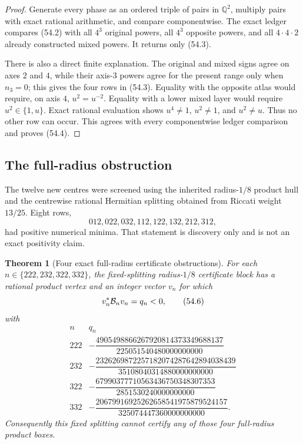 \documentclass[11pt,oneside]{article}
\newtheorem{theorem}{Theorem}[section]
\theoremstyle{definition}
\theoremstyle{remark}
\begin{document}
\begin{proof}
Generate every phase as an ordered triple of pairs in
\(\mathbb Q^2\), multiply pairs with exact rational arithmetic, and
compare componentwise.  The exact ledger compares (54.2) with all
\(4^3\) original powers, all \(4^3\) opposite powers, and all
\(4\cdot4\cdot2\) already constructed mixed powers.  It returns
only (54.3).

There is also a direct finite explanation.  The original and mixed
signs agree on axes \(2\) and \(4\), while their axis-\(3\) powers
agree for the present range only when \(n_3=0\); this gives the
four rows in (54.3).  Equality with the opposite atlas would
require, on axis \(4\), \(u^2=u^{-2}\).  Equality with a lower mixed
layer would require \(u^2\in\{1,u\}\).  Exact rational evaluation
shows \(u^4\ne1\), \(u^2\ne1\), and \(u^2\ne u\).  Thus no other
row can occur.  This agrees with every componentwise ledger
comparison and proves (54.4).
\end{proof}

\subsection{The full-radius obstruction}

The twelve new centres were screened using the inherited
radius-\(1/8\) product hull and the centrewise rational Hermitian
splitting obtained from Riccati weight \(13/25\).  Eight rows,
\[
 012,022,032,112,122,132,212,312,                     \tag{54.5}
\]
had positive numerical minima.  That statement is discovery only
and is not an exact positivity claim.

\begin{theorem}[Four exact full-radius certificate obstructions]
\label{thm:newv54-full-obstructions}
For each \(n\in\{222,232,322,332\}\), the fixed-splitting
radius-\(1/8\) certificate block has a rational product vertex and
an integer vector \(v_n\) for which
\[
 v_n^*{\cal B}_n v_n=q_n<0,                           \tag{54.6}
\]
with
\[
\begin{array}{c|c}
n&q_n\\ \hline
222&-\dfrac{4905498866267920814373349688137}
{225051540480000000000}\\[5pt]
232&-\dfrac{2326269872257182074287642894038439}
{35108040314880000000000}\\[5pt]
322&-\dfrac{67990377710563436750348307353}
{2851530240000000000}\\[5pt]
332&-\dfrac{20679916925262658541975879524157}
{325074447360000000000}.
\end{array}                                             \tag{54.7}
\]
Consequently this fixed splitting cannot certify any of those four
full-radius product boxes.
\end{theorem}
\end{document}
